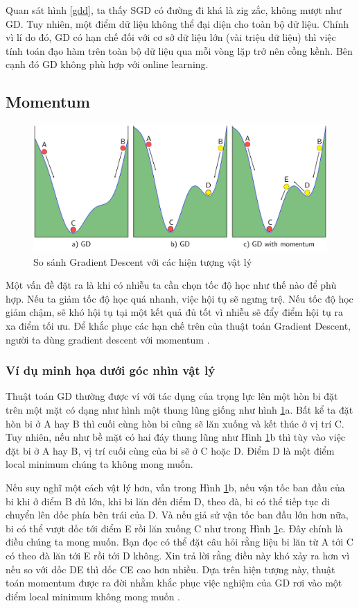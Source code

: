 \documentclass[11pt,oneside,a4paper]{report}
\theoremstyle{definition}
\begin{document}
Quan sát hình \ref{gdd}, ta thấy SGD có đường đi khá là zig zắc, không mượt như GD. Tuy nhiên, một điểm dữ liệu không thể đại diện cho toàn bộ dữ liệu. Chính vì lí do đó, GD có hạn chế đối với cơ sở dữ liệu lớn (vài triệu dữ liệu) thì việc tính toán đạo hàm trên toàn bộ dữ liệu qua mỗi vòng lặp trở nên cồng kềnh. Bên cạnh đó GD không phù hợp với online learning. 
\subsection{Momentum}
\begin{figure}[!h]
\centering
\includegraphics[scale=0.05]{images/h4}
\caption{So sánh Gradient Descent với các hiện tượng vật lý}
\label{olllolll}
\end{figure}
Một vấn đề đặt ra là khi có nhiễu ta cần chọn tốc độ học như thế nào để phù hợp. Nếu ta giảm tốc độ học quá nhanh, việc hội tụ sẽ ngưng trệ. Nếu tốc độ học giảm chậm, sẽ khó hội tụ tại một kết quả đủ tốt vì nhiễu sẽ đẩy điểm hội tụ ra xa điểm tối ưu. Để khắc phục các hạn chế trên của thuật toán Gradient Descent, người ta dùng gradient descent với momentum \cite{4}. 

\subsubsection{Ví dụ minh họa dưới góc nhìn vật lý}
Thuật toán GD thường được ví với tác dụng của trọng lực lên một hòn bi đặt trên một mặt có dạng như hình một thung lũng giống như hình \ref{olllolll}a. Bất kể ta đặt hòn bi ở A hay B thì cuối cùng hòn bi cũng sẽ lăn xuống và kết thúc ở vị trí C. Tuy nhiên, nếu như bề mặt có hai đáy thung lũng như Hình \ref{olllolll}b thì tùy vào việc đặt bi ở A hay B, vị trí cuối cùng của bi sẽ ở C hoặc D. Điểm D là một điểm local minimum chúng ta không mong muốn.

Nếu suy nghĩ một cách vật lý hơn, vẫn trong Hình \ref{olllolll}b, nếu vận tốc ban đầu của bi khi ở điểm B đủ lớn, khi bi lăn đến điểm D, theo đà, bi có thể tiếp tục di chuyển lên dốc phía bên trái của D. Và nếu giả sử vận tốc ban đầu lớn hơn nữa, bi có thể vượt dốc tới điểm E rồi lăn xuống C như trong Hình \ref{olllolll}c. Đây chính là điều chúng ta mong muốn. Bạn đọc có thể đặt câu hỏi rằng liệu bi lăn từ A tới C có theo đà lăn tới E rồi tới D không. Xin trả lời rằng điều này khó xảy ra hơn vì nếu so với dốc DE thì dốc CE cao hơn nhiều. Dựa trên hiện tượng này, thuật toán momentum được ra đời nhằm khắc phục việc nghiệm của GD rơi vào một điểm local minimum không mong muốn \cite{4, 5}.
\end{document}
